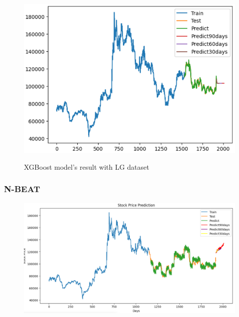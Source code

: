 \documentclass{article}
\begin{document}
\begin{multicols}{2}
\begin{figure}[H]
\begin{minipage}{0.15\textwidth}
    \label{fig:2}
    \end{minipage}%
    \begin{minipage}{0.15\textwidth}
    \centering
    \includegraphics[width=1\textwidth]{Image/XGBoost/XGBoost_LG_8_2.png}

    \label{fig:3}
    \end{minipage}
    \caption{ XGBoost model's result with LG dataset }
\end{figure}


\subsubsection{N-BEAT}




\begin{figure}[H]
    \centering
    \begin{minipage}{0.15\textwidth}
    \centering
    \includegraphics[width=1\textwidth]{Image/NBeat/N_BEAT_LG_6_4.png}
   

\end{minipage}
\end{figure}
\end{multicols}
\end{document}
